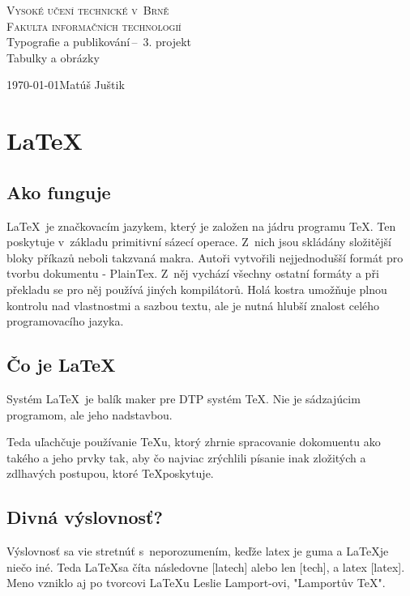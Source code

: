 \documentclass[a4paper, 11pt]{article}
\begin{document}
  
  \begin{titlepage}
    \begin{center} 
    \textsc{\Huge Vysoké učení technické v~Brně\\ \huge Fakulta informačních technologií \\}
    \LARGE Typografie a publikování\,--\ 3. projekt \\ \Huge Tabulky a obrázky
    \end{center}
    \Large \today \hfill Matúš Juštik

  \end{titlepage}

\section{\LaTeX}
\subsection{Ako funguje}
\LaTeX \ je značkovacím jazykem, který je založen na jádru programu \TeX. Ten poskytuje
v~základu primitivní sázecí operace. Z~nich jsou skládány složitější bloky příkazů neboli
takzvaná makra. Autoři vytvořili nejjednodušší formát pro tvorbu dokumentu - PlainTex.
Z~něj vychází všechny ostatní formáty a při překladu se pro něj používá jiných kompilátorů.
Holá kostra umožňuje plnou kontrolu nad vlastnostmi a sazbou textu, ale je nutná hlubší
znalost celého programovacího jazyka. \cite{FITMT13353}

\subsection{Čo je \LaTeX}
Systém \LaTeX\ je balík maker pre DTP systém \TeX. Nie je sádzajúcim programom, ale jeho nadstavbou. \par
Teda uľachčuje používanie \TeX u, ktorý zhrnie spracovanie dokomuentu ako takého a jeho prvky tak, aby
čo najviac zrýchlili písanie inak zložitých a zdlhavých postupou, ktoré \TeX poskytuje. \cite{FITMT13471}

\subsection{Divná výslovnosť?}
Výslovnosť sa vie stretnúť s~neporozumením, keďže latex je guma a \LaTeX je  niečo iné. Teda \LaTeX sa číta následovne [latech] alebo len [tech], a latex [latex]. Meno vzniklo aj po tvorcovi \LaTeX u Leslie Lamport-ovi, "Lamportův TeX". \cite{Martinek}
\end{document}
